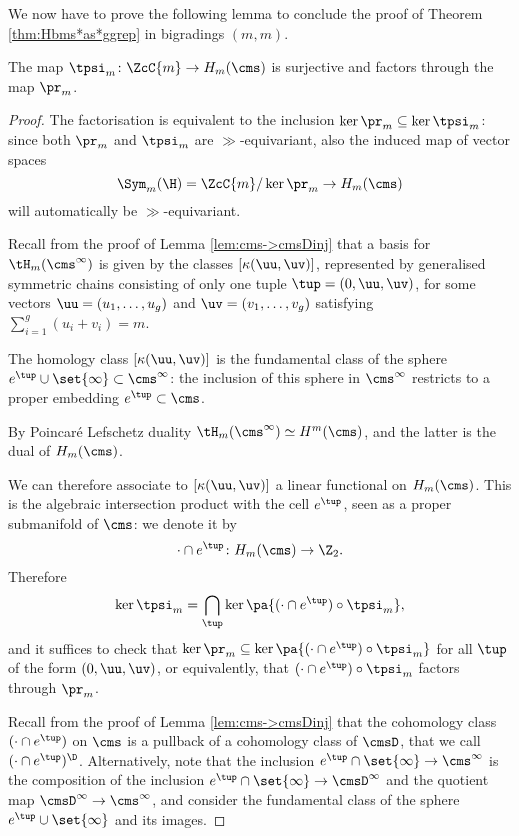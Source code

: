 We now have to prove the following lemma to conclude the proof of Theorem \ref{thm:Hbms*as*ggrep}
in bigradings $(m,m)$.
\begin{lem}
 \label{lem:tpsi->psi}
The map $\tpsi_m\colon\ZcC{m}\to H_m(\cms)$ is surjective and factors through the map $\pr_m$.
\end{lem}
\begin{proof}
The factorisation is equivalent to the inclusion $\ker\pr_m\subseteq\ker\tpsi_m$: since both
$\pr_m$ and $\tpsi_m$
are $\gg$-equivariant, also the induced map of vector spaces
\[
\Sym_m(\H)=\ZcC{m}/\ker\pr_m\to H_m(\cms)
\]
will automatically be
$\gg$-equivariant.

Recall from the proof of Lemma \ref{lem:cms->cmsDinj} that a basis for $\tH_m(\cms^{\infty})$ 
is given by the classes $[\kappa(\uu,\uv)]$, represented by generalised
symmetric chains consisting of only one tuple $\tup=(0,\uu,\uv)$, for some vectors
$\uu=(u_1,\dots,u_g)$ and $\uv=(v_1,\dots,v_g)$ satisfying $\sum_{i=1}^g(u_i+v_i)=m$.

The homology class
$[\kappa(\uu,\uv)]$ is the fundamental class
of the sphere $e^{\tup}\cup\set{\infty}\subset\cms^{\infty}$: the inclusion of this sphere in $\cms^{\infty}$
restricts to a proper embedding $e^{\tup}\subset\cms$.

By Poincaré Lefschetz duality $\tH_m(\cms^{\infty})\simeq H^m(\cms)$, and the latter is
the dual of $H_m(\cms)$.

We can therefore associate to $[\kappa(\uu,\uv)]$ a linear functional
on $H_m(\cms)$. This is the algebraic intersection product with the cell $e^{\tup}$, seen as a proper submanifold of $\cms$:
we denote it by
\[
 \cdot\cap e^{\tup}\colon H_m(\cms)\to\Z_2.
\]
Therefore
\[
 \ker\tpsi_m=\bigcap_{\tup}\ker\pa{(\cdot\cap e^{\tup})\circ\tpsi_m},
\]
and it suffices to check that $\ker\pr_m\subseteq\ker\pa{(\cdot\cap e^{\tup})\circ\tpsi_m}$
for all $\tup$ of the form $(0,\uu,\uv)$, or equivalently, that $(\cdot\cap e^{\tup})\circ\tpsi_m$ factors through $\pr_m$.

Recall from the proof of Lemma \ref{lem:cms->cmsDinj} that the cohomology class $(\cdot\cap e^{\tup})$ on $\cms$ is a pullback
of a cohomology class of $\cmsD$, that we call $(\cdot\cap e^{\tup})^{\D}$. Alternatively,
note that the inclusion $e^{\tup}\cap \set{\infty}\to\cms^{\infty}$ is the composition of the inclusion $e^{\tup}\cap\set{\infty}\to\cmsD^{\infty}$
and the quotient map $\cmsD^{\infty}\to\cms^{\infty}$, and consider the fundamental class of the sphere $e^{\tup}\cup\set{\infty}$ and its images.


\end{proof}
